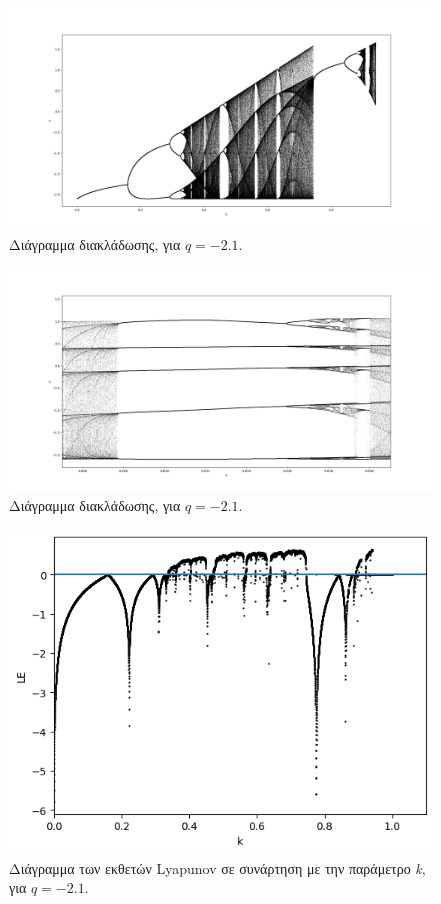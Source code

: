 \begin{figure}[h!]
	\centering
	\includegraphics[width=0.8\linewidth]{LateX images/graphs q21/g1}
	\caption{ Διάγραμμα διακλάδωσης, για $q=-2.1$.}
	\label{f:g41}
\end{figure}

\begin{figure}[h!]
	\centering
	\includegraphics[width=0.8\linewidth]{LateX images/graphs q21/g3}
	\caption{ Διάγραμμα διακλάδωσης, για $q=-2.1$.}
	\label{f:g43}
\end{figure}


\begin{figure}[h!]
	\centering
	\includegraphics[width=0.6\linewidth]{LateX images/graphs q21/g2}
	\caption{Διάγραμμα των εκθετών Lyapunov σε συνάρτηση με την παράμετρο \emph{k}, για $q=-2.1$.}
	\label{f:g42}
\end{figure}

